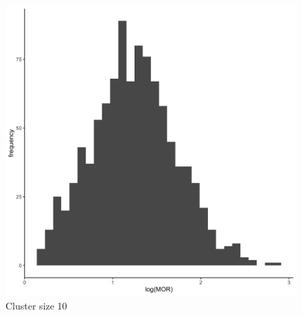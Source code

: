 \documentclass[
  letterpaper,
  DIV=11,
  numbers=noendperiod,
  titlepage]{scrartcl}
\begin{document}
\begin{figure}
\begin{minipage}[t]{0.24\linewidth}
{{\includegraphics{../../plots/two-lvl-ran-slope/high-prev/hist_30_10_two_lvl_slp_high_prev_q1.png}

}

\caption{Cluster size 10}

}

\end{minipage}%
%
\begin{minipage}[t]{0.24\linewidth}

{\centering 

}
\end{minipage}
\end{figure}
\end{document}
